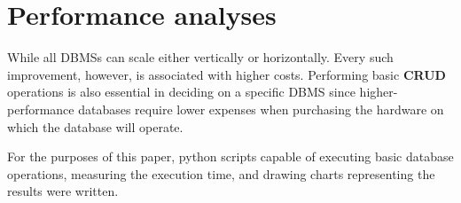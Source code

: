 \section{Performance analyses}

\par While all DBMSs can scale either vertically or horizontally. Every such improvement, however, is associated with higher costs. Performing basic \textbf{CRUD} operations is also essential in deciding on a specific DBMS since higher-performance databases require lower expenses when purchasing the hardware on which the database will operate.
\par For the purposes of this paper, python scripts capable of executing basic database operations, measuring the execution time, and drawing charts representing the results were written. 

